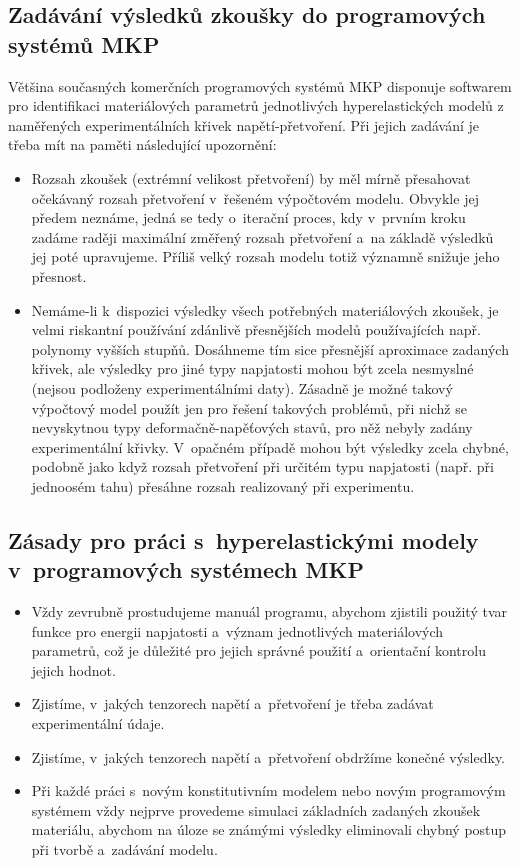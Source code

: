 \subsection{Zadávání výsledků zkoušky do programových systémů MKP}
Většina současných komerčních programových systémů MKP disponuje softwarem pro identifikaci materiálových parametrů jednotlivých hyperelastických modelů z naměřených experimentálních křivek napětí-přetvoření. Při jejich zadávání je třeba mít na paměti následující upozornění:
\begin{itemize}
	\item Rozsah zkoušek (extrémní velikost přetvoření) by měl mírně přesahovat očekávaný rozsah přetvoření v~řešeném výpočtovém modelu. Obvykle jej předem neznáme, jedná se tedy o~iterační proces, kdy v~prvním kroku zadáme raději maximální změřený rozsah přetvoření a~na základě výsledků jej poté upravujeme. Příliš velký rozsah modelu totiž významně snižuje jeho přesnost.
	\item Nemáme-li k~dispozici výsledky všech potřebných materiálových zkoušek, je velmi riskantní používání zdánlivě přesnějších modelů používajících např. polynomy vyšších stupňů. Dosáhneme tím sice přesnější aproximace zadaných křivek, ale výsledky pro jiné typy napjatosti mohou být zcela nesmyslné (nejsou podloženy experimentálními daty). Zásadně je možné takový výpočtový model použít jen pro řešení takových problémů, při nichž se nevyskytnou typy deformačně-napěťových stavů, pro něž nebyly zadány experimentální křivky. V~opačném případě mohou být výsledky zcela chybné, podobně jako když rozsah přetvoření při určitém typu napjatosti (např. při jednoosém tahu) přesáhne rozsah realizovaný při experimentu.
\end{itemize}

\subsection{Zásady pro práci s~hyperelastickými modely v~programových systémech MKP}
\begin{itemize}
	\item Vždy zevrubně prostudujeme manuál programu, abychom zjistili použitý tvar funkce pro energii napjatosti a~význam jednotlivých materiálových parametrů, což je důležité pro jejich správné použití a~orientační kontrolu jejich hodnot.
	\item Zjistíme, v~jakých tenzorech napětí a~přetvoření je třeba zadávat experimentální údaje.
	\item Zjistíme, v~jakých tenzorech napětí a~přetvoření obdržíme konečné výsledky. 
	\item Při každé práci s~novým konstitutivním modelem nebo novým programovým systémem vždy nejprve provedeme simulaci základních zadaných zkoušek materiálu, abychom na úloze se známými výsledky eliminovali chybný postup při tvorbě a~zadávání modelu.
\end{itemize}
